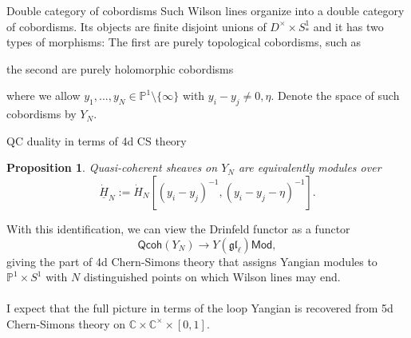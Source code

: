 \documentclass[11pt]{beamer}
\newtheorem{prop}[theorem]{Proposition}
\theoremstyle{remark}
\theoremstyle{remark}
\newcommand{\C}{\mathbb{C}}
\renewcommand{\P}{\mathbb{P}}
\begin{document}
\begin{frame}[fragile]{Double category of cobordisms}
Such Wilson lines organize into a double category of cobordisms. Its objects are finite disjoint unions of $D^\times \times S_*^1$ and it has two types of morphisms: The first are purely topological cobordisms, such as
\begin{center}
\end{center}
the second are purely holomorphic cobordisms
\begin{center}
\end{center}
where we allow $y_1,...,y_N \in \P^1 \setminus \{ \infty \}$ with $y_i-y_j \neq 0,\eta$. Denote the space of such cobordisms by $Y_N$.
\end{frame}

\begin{frame}{QC duality in terms of 4d CS theory}
\begin{prop}
Quasi-coherent sheaves on $Y_N$ are equivalently modules over
\begin{equation*}
\underline{\dot H}_N := \dot H_N[(y_i-y_j)^{-1},(y_i-y_j-\eta)^{-1}].
\end{equation*}
\end{prop}
With this identification, we can view the Drinfeld functor as a functor
\begin{equation*}
\mathsf{Qcoh}(Y_N) \to Y(\mathfrak{gl}_\ell)\mathsf{Mod},
\end{equation*}
giving the part of 4d Chern-Simons theory that assigns Yangian modules to $\P^1 \times S^1$ with $N$ distinguished points on which Wilson lines may end.
\\~\\
I expect that the full picture in terms of the loop Yangian is recovered from 5d Chern-Simons theory on $\C \times \C^\times \times [0,1]$.
\end{frame}
\end{document}
